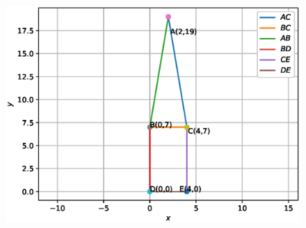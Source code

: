 \begin{frame}{}
\begin{figure}[!ht]
	\begin{center}
\includegraphics[width=1\columnwidth]{./figs/tri_rect.eps}
	\end{center}
	\caption{}
	\label{}	
\end{figure} 
\end{frame}
\begin{frame}{}
\begin{figure}[!ht]
	\begin{center}
		\resizebox{0.3\columnwidth}{!}{}
	\end{center}
	\caption{}
	\label{}	
\end{figure}
\end{frame}
